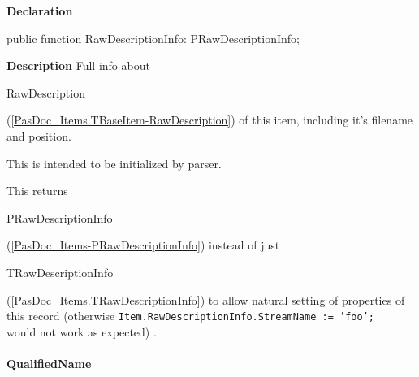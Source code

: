 \documentclass{report}
\newif\ifpdf
\begin{document}
\label{PasDoc_Items.TBaseItem-RawDescriptionInfo}
\begin{list}{}{
\setlength{\itemindent}{0cm}
\setlength{\listparindent}{0cm}
\setlength{\leftmargin}{\evensidemargin}
\addtolength{\leftmargin}{\tmplength}
\settowidth{\labelsep}{X}
\addtolength{\leftmargin}{\labelsep}
\setlength{\labelwidth}{\tmplength}
}
\item[\textbf{Declaration}\hfill]
\ifpdf
\begin{flushleft}
\fi
\begin{ttfamily}
public function RawDescriptionInfo: PRawDescriptionInfo;\end{ttfamily}

\ifpdf
\end{flushleft}
\fi

\par
\item[\textbf{Description}]
Full info about \begin{ttfamily}RawDescription\end{ttfamily}(\ref{PasDoc_Items.TBaseItem-RawDescription}) of this item, including it's filename and position.

This is intended to be initialized by parser.

This returns \begin{ttfamily}PRawDescriptionInfo\end{ttfamily}(\ref{PasDoc_Items-PRawDescriptionInfo}) instead of just \begin{ttfamily}TRawDescriptionInfo\end{ttfamily}(\ref{PasDoc_Items.TRawDescriptionInfo}) to allow natural setting of properties of this record (otherwise \texttt{Item.RawDescriptionInfo.StreamName~:=~'foo';\\
} would not work as expected) .

\end{list}
\paragraph*{QualifiedName}\hspace*{\fill}
\end{document}
